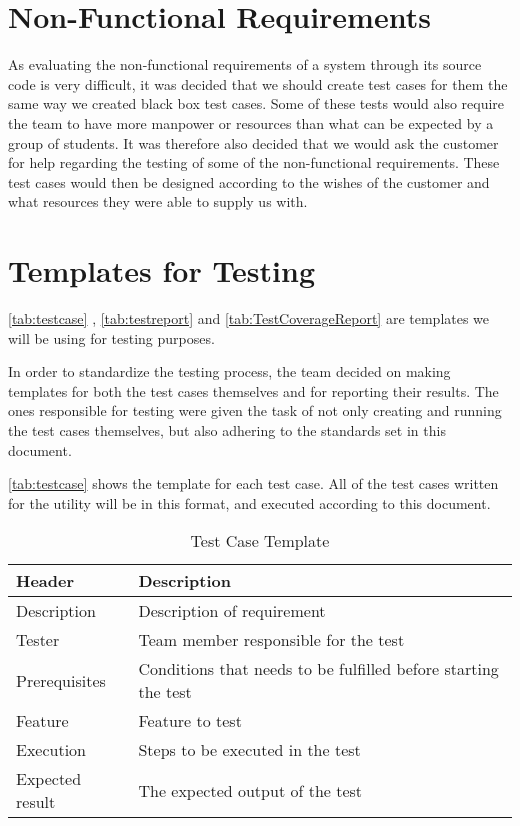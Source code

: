 \section{Non-Functional Requirements}
As evaluating the non-functional requirements of a system through its source code is very difficult, it was decided that we should create test cases for them the same way we created black box test cases. Some of these tests would also require the team to have more manpower or resources than what can be expected by a group of students. It was therefore also decided that we would ask the customer for help regarding the testing of some of the non-functional requirements. These test cases would then be designed according to the wishes of the customer and what resources they were able to supply us with.

\section{Templates for Testing}
\autoref{tab:testcase} , \autoref{tab:testreport} and \autoref{tab:TestCoverageReport} are templates we will be
using for testing purposes.

In order to standardize the testing process, the team decided on making templates for both the test cases themselves and for reporting their results. The ones responsible for testing were given the task of not only creating and running the test cases themselves, but also adhering to the standards set in this document.

\autoref{tab:testcase} shows the template for each test case. All of the test cases written for the \gls{utility} will be in this format, and executed according to this document.

\begin{table}[htb] \small \center
\caption{Test Case Template \label{tab:testcase}}
\begin{tabular}{l l}
	\toprule
	Header & Description \\
	\midrule
	Description & Description of requirement \\
	Tester & Team member responsible for the test \\
	Prerequisites & Conditions that needs to be fulfilled before starting the test \\
	Feature & Feature to test \\
	Execution & Steps to be executed in the test \\
	Expected result & The expected output of the test \\
	\bottomrule
\end{tabular}
\end{table}


